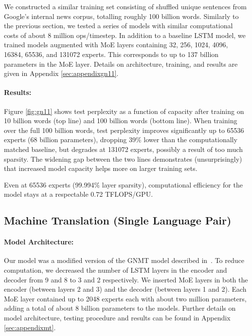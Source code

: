 \documentclass{article} \pdfoutput=1
\begin{document}
We constructed a similar training set consisting of shuffled unique sentences from Google's internal news corpus, totalling roughly 100 billion words.  Similarly to the previous section, we tested a series of models with similar computational costs of about 8 million ops/timestep.  In addition to a baseline LSTM model, we trained models augmented with MoE layers containing 32, 256, 1024, 4096, 16384, 65536, and 131072 experts.  This corresponds to up to 137 billion parameters in the MoE layer.  Details on architecture, training, and results are given in Appendix \ref{sec:appendixgn11}. 

\paragraph{Results:} Figure \ref{fig:gn11} shows test perplexity as a function of capacity after training on 10 billion words (top line) and 100 billion words (bottom line).  When training over the full 100 billion words, test perplexity improves significantly up to 65536 experts (68 billion parameters), dropping 39\% lower than the computationally matched baseline, but degrades at 131072 experts, possibly a result of too much sparsity.  The widening gap between the two lines demonstrates (unsurprisingly) that increased model capacity helps more on larger training sets.

Even at 65536 experts (99.994\% layer sparsity), computational efficiency for the model stays at a respectable 0.72 TFLOPS/GPU.




\subsection{Machine Translation (Single Language Pair)}
\label{sec:mt}
\paragraph{Model Architecture:} Our model was a modified version of the GNMT model described in~\citep{GNMT}.  To reduce computation, we decreased the number of LSTM layers in the encoder and decoder from 9 and 8 to 3 and 2 respectively.  We inserted MoE layers in both the encoder (between layers 2 and 3) and the decoder (between layers 1 and 2).  Each MoE layer contained up to 2048 experts each with about two million parameters, adding a total of about 8 billion parameters to the models.  Further details on model architecture, testing procedure and results can be found in Appendix \ref{sec:appendixmt}.
\end{document}
